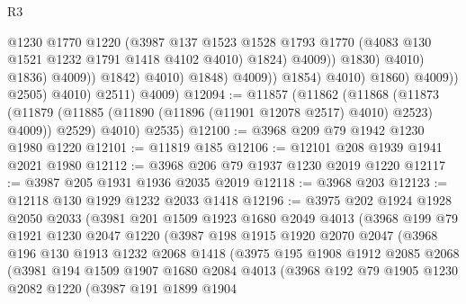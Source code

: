 \begin{lexlean}{R3}
\begin{coremodule}
                                              @1230
                                              @1770
                                              @1220
                                              (@3987
                                                @137
                                                @1523
                                                @1528
                                                @1793
                                                @1770
                                                (@4083 @130 @1521 @1232 @1791 @1418 @4102 @4010)
                                                @1824)
                                              @4009))
                                          @1830)
                                        @4010)
                                      @1836)
                                    @4009))
                                @1842)
                              @4010)
                            @1848)
                          @4009))
                      @1854)
                    @4010)
                  @1860)
                @4009))
            @2505)
          @4010)
        @2511)
      @4009)
@12094 := @11857
    (@11862
      (@11868
        (@11873 (@11879 (@11885 (@11890 (@11896 (@11901 @12078 @2517) @4010) @2523) @4009)) @2529)
        @4010)
      @2535)
@12100 := @3968 @209 @79 @1942 @1230 @1980 @1220
@12101 := @11819 @185
@12106 := @12101 @208 @1939 @1941 @2021 @1980
@12112 := @3968 @206 @79 @1937 @1230 @2019 @1220
@12117 := @3987 @205 @1931 @1936 @2035 @2019
@12118 := @3968 @203
@12123 := @12118 @130 @1929 @1232 @2033 @1418
@12196 := @3975
    @202
    @1924
    @1928
    @2050
    @2033
    (@3981
      @201
      @1509
      @1923
      @1680
      @2049
      @4013
      (@3968
        @199
        @79
        @1921
        @1230
        @2047
        @1220
        (@3987
          @198
          @1915
          @1920
          @2070
          @2047
          (@3968
            @196
            @130
            @1913
            @1232
            @2068
            @1418
            (@3975
              @195
              @1908
              @1912
              @2085
              @2068
              (@3981
                @194
                @1509
                @1907
                @1680
                @2084
                @4013
                (@3968
                  @192
                  @79
                  @1905
                  @1230
                  @2082
                  @1220
                  (@3987
                    @191
                    @1899
                    @1904

\end{coremodule}
\end{lexlean}
